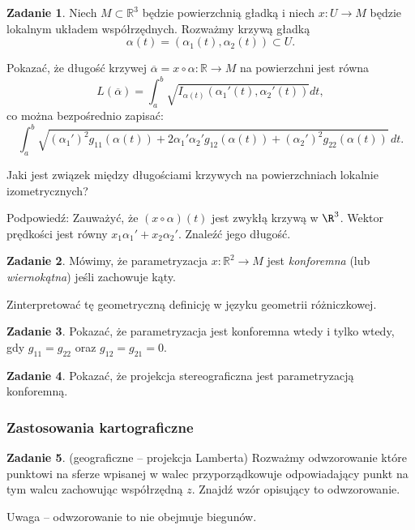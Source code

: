 \documentclass[a4paper,11pt]{article}
\theoremstyle{definition}\newtheorem{exercise}{Zadanie}
\theoremstyle{definition}\newtheorem{remark}{Uwaga}
\begin{document}
\begin{exercise}
Niech $M\subset \mathbb{R}^3$ będzie powierzchnią gładką i niech $x\colon U\to 
M$ będzie lokalnym układem współrzędnych. Rozważmy krzywą gładką 
\[\alpha(t)=(\alpha_1(t),\alpha_2(t))\subset U.\]

Pokazać, że długość krzywej $\overline{\alpha}=x\circ\alpha\colon \mathbb{R}\to 
M$ na powierzchni jest równa
\[L(\overline{\alpha})=\int_a^b\sqrt{I_{\alpha(t)}\left(\alpha_1 '(t),\alpha_2 
'(t)\right)}dt,\]
co można bezpośrednio zapisać:
\[\int_a^b\sqrt{\left(\alpha_1'\right)^2 g_{11}(\alpha(t))+ 2 
\alpha_1'\alpha_2'g_{12}(\alpha(t))+\left(\alpha_2'\right)^2 
g_{22}(\alpha(t))}\,dt.\]

Jaki jest związek między długościami krzywych na powierzchniach lokalnie 
izometrycznych?

\small {Podpowiedź: Zauważyć, że $(x\circ \alpha )(t)$ jest zwykłą krzywą w 
$\R^3$. Wektor prędkości jest r\'owny $x_1\alpha_1' +x_2\alpha_2'$. Znaleźć 
jego długość.}
\end{exercise} 
 

\begin{exercise}
 M\'owimy, że parametryzacja $x\colon \mathbb{R}^2\to M$ jest 
\textit{konforemna} (lub \textit{wiernokątna}) jeśli zachowuje kąty.

Zinterpretować tę geometryczną definicję w języku geometrii r\'ożniczkowej.
\end{exercise}
 
\begin{exercise}
 Pokazać, że parametryzacja jest konforemna wtedy i tylko wtedy, gdy $g_{11} 
=g_{22} $ oraz $g_{12} =g_{21} =0$.
\end{exercise}

\begin{exercise}
 Pokazać, że projekcja stereograficzna jest parametryzacją konforemną.
\end{exercise}

\subsubsection{Zastosowania kartograficzne}

\begin{exercise}(geograficzne -- projekcja Lamberta)
Rozważmy odwzorowanie kt\'ore punktowi na sferze wpisanej w walec 
przyporządkowuje odpowiadający punkt na tym walcu zachowując wsp\'ołrzędną $z$. 
Znajdź wz\'or opisujący to odwzorowanie.

\small{Uwaga -- odwzorowanie to nie obejmuje biegun\'ow.}
\end{exercise}
\end{document}
